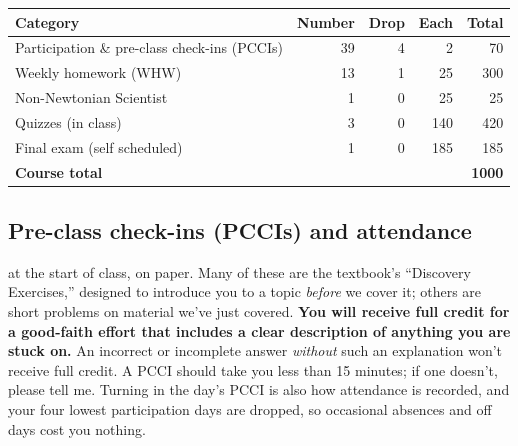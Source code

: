 \documentclass{tufte-handout}
\begin{document}
\medskip
{\small\noindent
  \begin{tabular}{@{}lrrrr@{}}
    \toprule
    \textbf{Category} & \textbf{Number} & \textbf{Drop} &
    \textbf{Each} & \textbf{Total}\\
    \midrule
    Participation \& pre-class check-ins (PCCIs) & 39 & 4 & 2 & 70\\
    Weekly homework (WHW) & 13 & 1 & 25 & 300\\
    Non-Newtonian Scientist & 1 & 0 & 25 & 25\\
    Quizzes (in class) & 3 & 0 & 140 & 420\\
    Final exam (self scheduled) & 1 & 0 & 185 & 185\\
    \midrule
    \textbf{Course total} & & & & \textbf{1000}\\
    \bottomrule
  \end{tabular}
}
\medskip
{}

\subsection{Pre-class check-ins (PCCIs) and attendance}

 at the start of
class, on paper. Many of these are the textbook's ``Discovery Exercises,''
designed to introduce you to a topic \emph{before} we cover it; others are short
problems on material we've just covered. \textbf{You will receive full credit
  for a good-faith effort that includes a clear description of anything you are
  stuck on.} An incorrect or incomplete answer \emph{without} such an
explanation won't receive full credit. A PCCI should take you less than
15 minutes; if one doesn't, please tell me. Turning in the day's PCCI is also
how attendance is recorded, and your four lowest participation days are dropped,
so occasional absences and off days cost you nothing.
\end{document}
